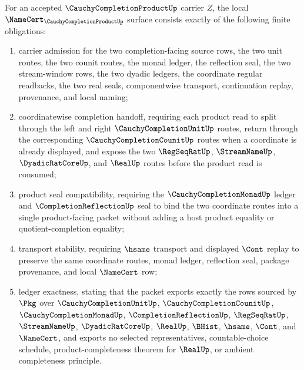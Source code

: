 \begin{theorem}
\label{thm:cauchy-completion-product-namecert-obligations}
For an accepted $\CauchyCompletionProductUp$ carrier $Z$, the local $\NameCert_{\CauchyCompletionProductUp}$ surface consists exactly of the following finite obligations:
\begin{enumerate}
\item carrier admission for the two completion-facing source rows, the two unit routes, the two counit routes, the monad ledger, the reflection seal, the two stream-window rows, the two dyadic ledgers, the coordinate regular readbacks, the two real seals, componentwise transport, continuation replay, provenance, and local naming;
\item coordinatewise completion handoff, requiring each product read to split through the left and right $\CauchyCompletionUnitUp$ routes, return through the corresponding $\CauchyCompletionCounitUp$ routes when a coordinate is already displayed, and expose the two $\RegSeqRatUp$, $\StreamNameUp$, $\DyadicRatCoreUp$, and $\RealUp$ routes before the product read is consumed;
\item product seal compatibility, requiring the $\CauchyCompletionMonadUp$ ledger and $\CompletionReflectionUp$ seal to bind the two coordinate routes into a single product-facing packet without adding a host product equality or quotient-completion equality;
\item transport stability, requiring $\hsame$ transport and displayed $\Cont$ replay to preserve the same coordinate routes, monad ledger, reflection seal, package provenance, and local $\NameCert$ row;
\item ledger exactness, stating that the packet exports exactly the rows sourced by $\Pkg$ over $\CauchyCompletionUnitUp$, $\CauchyCompletionCounitUp$, $\CauchyCompletionMonadUp$, $\CompletionReflectionUp$, $\RegSeqRatUp$, $\StreamNameUp$, $\DyadicRatCoreUp$, $\RealUp$, $\BHist$, $\hsame$, $\Cont$, and $\NameCert$, and exports no selected representatives, countable-choice schedule, product-completeness theorem for $\RealUp$, or ambient completeness principle.
\end{enumerate}
\end{theorem}
